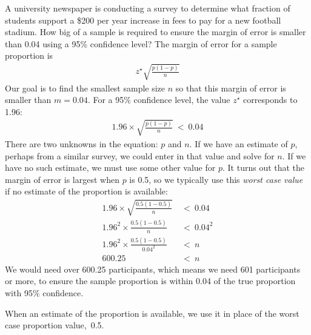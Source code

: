 \begin{examplewrap}
\begin{nexample}{A university newspaper is conducting a survey to determine what fraction of students support a \$200 per year increase in fees to pay for a new football stadium. How big of a sample is required to ensure the margin of error is smaller than 0.04 using a 95\% confidence level?}
The margin of error for a sample proportion is
\begin{align*}
z^{\star} \sqrt{\frac{p (1 - p)}{n}}
\end{align*}
Our goal is to find the smallest sample size $n$ so that this margin of error is smaller than $m=0.04$. For a 95\% confidence level, the value $z^{\star}$ corresponds to 1.96:
\begin{align*}
1.96\times \sqrt{\frac{p(1-p)}{n}} \ < \ 0.04
\end{align*}
There are two unknowns in the equation: $p$ and $n$. If we have an estimate of $p$, perhaps from a similar survey, we could enter in that value and solve for $n$. If we have no such estimate, we must use some other value for $p$. It turns out that the margin of error is largest when $p$ is 0.5, so we typically use this \emph{worst case value} if no estimate of the proportion is available:
\begin{align*}
	1.96\times \sqrt{\frac{0.5(1-0.5)}{n}} &\ < \ 0.04 \\
	1.96^2\times \frac{0.5(1-0.5)}{n} &\ < \ 0.04^2 \\
	1.96^2\times \frac{0.5(1-0.5)}{0.04^2} &\ < \ n \\
	600.25 &\ < \  n
\end{align*}
We would need over 600.25 participants, which means we need 601 participants or more, to ensure the sample proportion is within 0.04 of the true proportion with 95\% confidence.
\end{nexample}
\end{examplewrap}


When an estimate of the proportion is available, we use it in place of the worst case proportion value,~0.5.


